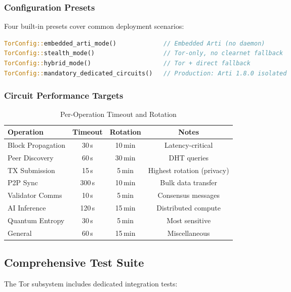 \documentclass[11pt,a4paper]{article}
\begin{document}
\subsubsection{Configuration Presets}

Four built-in presets cover common deployment scenarios:

\begin{lstlisting}[language=Rust, caption=Configuration Presets]
TorConfig::embedded_arti_mode()             // Embedded Arti (no daemon)
TorConfig::stealth_mode()                   // Tor-only, no clearnet fallback
TorConfig::hybrid_mode()                    // Tor + direct fallback
TorConfig::mandatory_dedicated_circuits()   // Production: Arti 1.8.0 isolated
\end{lstlisting}

\subsubsection{Circuit Performance Targets}

\begin{table}[H]
\centering
\caption{Per-Operation Timeout and Rotation}
\label{tab:circuit_perf}
\begin{tabular}{@{}lccc@{}}
\toprule
\textbf{Operation} & \textbf{Timeout} & \textbf{Rotation} & \textbf{Notes} \\
\midrule
Block Propagation & 30\,s & 10\,min & Latency-critical \\
Peer Discovery & 60\,s & 30\,min & DHT queries \\
TX Submission & 15\,s & 5\,min & Highest rotation (privacy) \\
P2P Sync & 300\,s & 10\,min & Bulk data transfer \\
Validator Comms & 10\,s & 5\,min & Consensus messages \\
AI Inference & 120\,s & 15\,min & Distributed compute \\
Quantum Entropy & 30\,s & 5\,min & Most sensitive \\
General & 60\,s & 15\,min & Miscellaneous \\
\bottomrule
\end{tabular}
\end{table}

\subsection{Comprehensive Test Suite}

The Tor subsystem includes dedicated integration tests:
\end{document}

